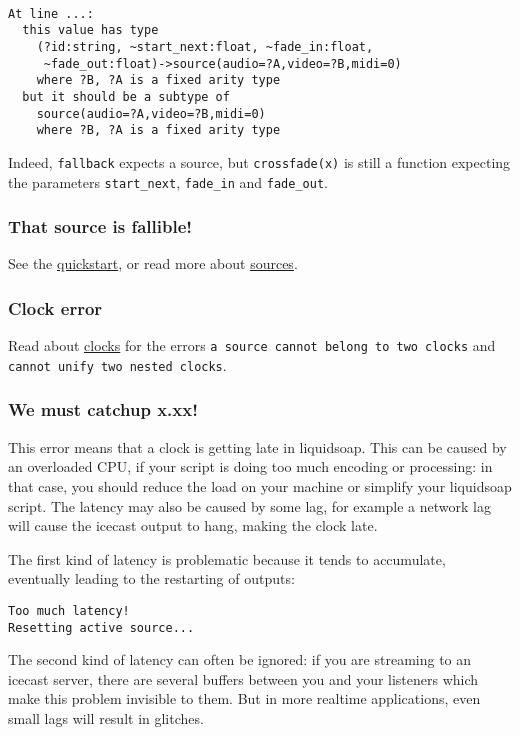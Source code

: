 \begin{verbatim}

At line ...:
  this value has type
    (?id:string, ~start_next:float, ~fade_in:float,
     ~fade_out:float)->source(audio=?A,video=?B,midi=0)
    where ?B, ?A is a fixed arity type
  but it should be a subtype of
    source(audio=?A,video=?B,midi=0)
    where ?B, ?A is a fixed arity type
\end{verbatim}
Indeed, \verb+fallback+ expects a source, but \verb+crossfade(x)+ is still a function expecting the parameters \verb+start_next+, \verb+fade_in+ and \verb+fade_out+.

\subsubsection{That source is fallible!}
See the \href{quick_start.html}{quickstart}, or read more about 
\href{sources.html}{sources}.

\subsubsection{Clock error}
Read about \href{clocks.html}{clocks} for the errors
\verb+a source cannot belong to two clocks+
and
\verb+cannot unify two nested clocks+.

\subsubsection{We must catchup x.xx!}
This error means that a clock is getting late in liquidsoap. This can
be caused by an overloaded CPU, if your script is doing too much encoding
or processing: in that case, you should reduce the load on your machine
or simplify your liquidsoap script. The latency may also be caused by
some lag, for example a network lag will cause the icecast output to
hang, making the clock late.

The first kind of latency is problematic because it tends to accumulate,
eventually leading to the restarting of outputs: \begin{verbatim}
Too much latency!
Resetting active source...
\end{verbatim}


The second kind of latency can often be ignored: if you are streaming to
an icecast server, there are several buffers between you and your
listeners which make this problem invisible to them. But in more realtime
applications, even small lags will result in glitches.

